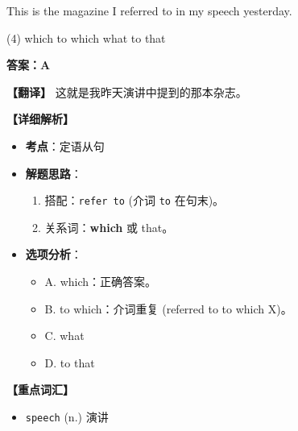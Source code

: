 \documentclass[11pt, a4paper]{article}
\newcommand{\analysis}[4]{
    \begin{solutionbox}
        \textbf{答案：#1}
        
        \textbf{【翻译】} #2
        
        \textbf{【详细解析】}
        #3
        
        \textbf{【重点词汇】}
        #4
    \end{solutionbox}
}
\newcommand{\blank}{\underline{\hspace{1.5cm}}}
\begin{document}
\begin{questions}
    \item This is the magazine \blank I referred to in my speech yesterday.
    \begin{tasks}(4)
        \task which \task to which \task what \task to that
    \end{tasks}
    \analysis{A}{这就是我昨天演讲中提到的那本杂志。}{
        \begin{itemize}
            \item \textbf{考点}：定语从句
            \item \textbf{解题思路}：
                \begin{enumerate}
                    \item 搭配：\texttt{refer to} (介词 \texttt{to} 在句末)。
                    \item 关系词：\textbf{which} 或 that。
                \end{enumerate}
            \item \textbf{选项分析}：
                \begin{itemize}
                    \item A. which：正确答案。
                    \item B. to which：介词重复 (referred to to which X)。
                    \item C. what
                    \item D. to that
                \end{itemize}
        \end{itemize}
    }{
        \begin{itemize}
            \item \texttt{speech} (n.) 演讲
        \end{itemize}
    }


\end{questions}
\end{document}
